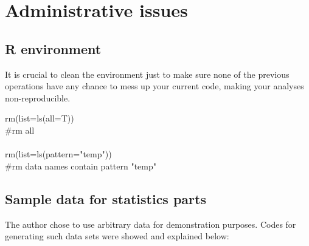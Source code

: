 \documentclass[../note.tex]{subfiles} %
\begin{document}
\section{Administrative issues}

\subsection{R environment}
It is crucial to clean the environment just to make sure none of the previous operations have any chance to mess up your current code, making your analyses non-reproducible.
\begin{code}
rm(list=ls(all=T))\\\#rm all\\\\
rm(list=ls(pattern="temp"))\\\#rm data names contain pattern "temp"
\end{code}

\subsection{Sample data for statistics parts}
The author chose to use arbitrary data for demonstration purposes.  Codes for generating such data sets were showed and explained below:
\end{document}
